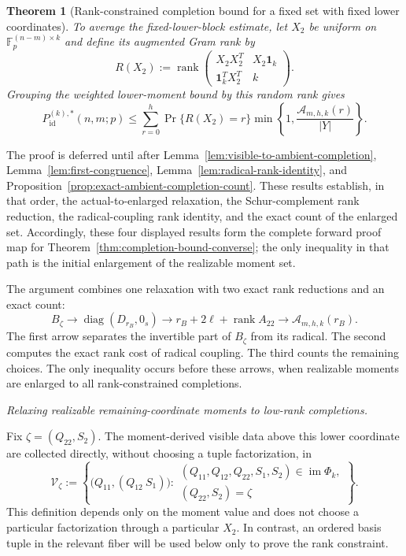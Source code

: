 \documentclass[11pt]{article}
\newcommand{\F}{\mathbb F}
\newcommand{\rank}{\operatorname{rank}}
\newcommand{\1}{\mathbf 1}
\theoremstyle{plain}
\newtheorem{theorem}{Theorem}[section]
\theoremstyle{definition}
\theoremstyle{remark}
\begin{document}
\begin{theorem}[Rank-constrained completion bound for a fixed set with fixed lower coordinates]
To average the fixed-lower-block estimate, let $X_2$ be uniform on
$\F_p^{(n-m)\times k}$ and define its augmented Gram rank by
\begin{equation}
 R(X_2):=\rank
 \begin{pmatrix}X_2X_2^T&X_2\1_k\\
 \1_k^TX_2^T&k\end{pmatrix}.
 \label{eq:random-augmented-rank}
\end{equation}
Grouping the weighted lower-moment bound by this random rank gives
\begin{equation}
 P_{\mathrm{id}}^{(k),*}(n,m;p)
 \le\sum_{r=0}^{h}\Pr\{R(X_2)=r\}
 \min\left\{1,\frac{\mathcal A_{m,h,k}(r)}{\lvert Y\rvert}\right\}.
 \label{eq:rank-grouped-bound}
\end{equation}
\end{theorem}
The proof is deferred until after
Lemma~\ref{lem:visible-to-ambient-completion},
Lemma~\ref{lem:first-congruence},
Lemma~\ref{lem:radical-rank-identity}, and
Proposition~\ref{prop:exact-ambient-completion-count}.  These results establish,
in that order, the actual-to-enlarged relaxation, the Schur-complement rank
reduction, the radical-coupling rank identity, and the exact count of the
enlarged set.
Accordingly, these four displayed results form the complete forward proof map for Theorem~\ref{thm:completion-bound-converse}; the only inequality in that path is the initial enlargement of the realizable moment set.

The argument combines one relaxation with two exact rank reductions and an exact count:
\[
 B_{\zeta}
 \longrightarrow \operatorname{diag}(D_{r_B},0_s)
 \longrightarrow r_B+2\ell+\rank A_{22}
 \longrightarrow \mathcal A_{m,h,k}(r_B).
\]
The first arrow separates the invertible part of $B_{\zeta}$ from its radical.
The second computes the exact rank cost of radical coupling.  The third counts
the remaining choices.  The only inequality occurs before these arrows, when
realizable moments are enlarged to all rank-constrained completions.

\medskip\noindent\emph{Relaxing realizable remaining-coordinate moments to low-rank completions.}\par

Fix $\zeta=(Q_{22},S_2)$.  The moment-derived visible data above this lower
coordinate are collected directly, without choosing a tuple factorization, in
\begin{equation}
 \mathcal V_{\zeta}
 :=\left\{
 \bigl(Q_{11},(Q_{12}\ S_1)\bigr):
 \begin{array}{l}
 (Q_{11},Q_{12},Q_{22},S_1,S_2)\in\operatorname{im}\Phi_k,\\
 (Q_{22},S_2)=\zeta
 \end{array}
 \right\}.
 \label{eq:actual-visible-completion-set}
\end{equation}
This definition depends only on the moment value and does not choose a
particular factorization through a particular $X_2$.  In contrast, an ordered basis tuple in the relevant fiber will be
used below only to prove the rank constraint.
\end{document}

